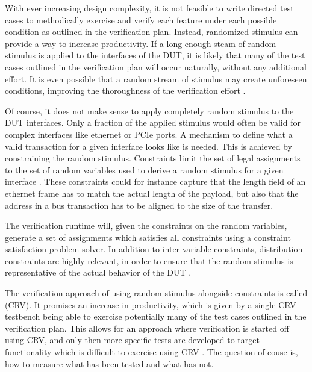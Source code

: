 With ever increasing design complexity, it is not feasible to write directed test cases to methodically exercise and
verify each feature under each possible condition as outlined in the verification plan. Instead, randomized stimulus
can provide a way to increase productivity. If a long enough steam of random stimulus is applied to the interfaces of
the DUT, it is likely that many of the test cases outlined in the verification plan will occur naturally, without any
additional effort. It is even possible that a random stream of stimulus may create unforeseen conditions, improving
the thoroughness of the verification effort \cite[Ch. 1]{bergeron2005verification}.

Of course, it does not make sense to apply completely random stimulus to the DUT interfaces. Only a fraction of the
applied stimulus would often be valid for complex interfaces like ethernet or PCIe ports. A mechanism to define what
a valid transaction for a given interface looks like is needed. This is achieved by constraining the random stimulus.
Constraints limit the set of legal assignments to the set of random variables used to derive a random stimulus for a
given interface \cite[Ch. 3]{bergeron2012writing}. These constraints could for instance capture that the length field
of an ethernet frame has to match the actual length of the payload, but also that the address in a bus transaction
has to be aligned to the size of the transfer.

The verification runtime will, given the constraints on the random variables, generate a set of assignments which
satisfies all constraints using a constraint satisfaction problem solver. In addition to inter-variable
constraints, distribution constraints are highly relevant,
in order to ensure that the random stimulus is representative of the actual behavior of the DUT \cite[Sec. 7.5]{flake2020a}.

The verification approach of using random stimulus alongside constraints is called 
(CRV). It promises an increase in productivity, which is given by a single CRV testbench being able to exercise
potentially many of the test cases outlined in the verification plan. This allows for an approach where verification
is started off using CRV, and only then more specific tests are developed to target functionality which is difficult
to exercise using CRV \cite[Ch. 3]{bergeron2012writing}. The question of couse is, how to measure what has been
tested and what has not.

